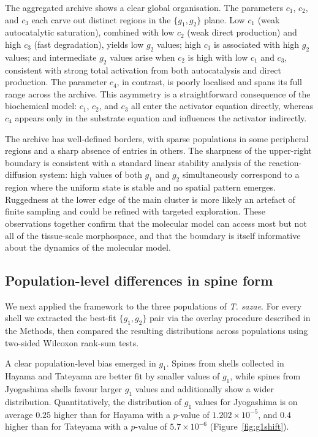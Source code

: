 \documentclass[11pt]{article}
\begin{document}
The aggregated archive shows a clear global organisation. The parameters
$c_1$, $c_2$, and $c_3$ each carve out distinct regions in the $\{g_1,
g_2\}$ plane. Low $c_1$ (weak autocatalytic saturation), combined with low
$c_2$ (weak direct production) and high $c_3$ (fast degradation), yields
low $g_2$ values; high $c_1$ is associated with high $g_2$ values; and
intermediate $g_2$ values arise when $c_2$ is high with low $c_1$ and
$c_3$, consistent with strong total activation from both autocatalysis and
direct production. The parameter $c_4$, in contrast, is poorly localised
and spans its full range across the archive. This asymmetry is a
straightforward consequence of the biochemical model: $c_1$, $c_2$, and
$c_3$ all enter the activator equation directly, whereas $c_4$ appears
only in the substrate equation and influences the activator indirectly.

The archive has well-defined borders, with sparse populations in some
peripheral regions and a sharp absence of entries in others. The sharpness
of the upper-right boundary is consistent with a standard linear stability
analysis of the reaction-diffusion system: high values of both $g_1$ and
$g_2$ simultaneously correspond to a region where the uniform state is
stable and no spatial pattern emerges. Ruggedness at the lower edge of the
main cluster is more likely an artefact of finite sampling and could be
refined with targeted exploration. These observations together confirm
that the molecular model can access most but not all of the tissue-scale
morphospace, and that the boundary is itself informative about the
dynamics of the molecular model.

\subsection{Population-level differences in spine form}

We next applied the framework to the three populations of
\textit{T. sazae}. For every shell we extracted the best-fit
$\{g_1, g_2\}$ pair via the overlay procedure described in the Methods,
then compared the resulting distributions across populations using
two-sided Wilcoxon rank-sum tests.

A clear population-level bias emerged in $g_1$. Spines from shells
collected in Hayama and Tateyama are better fit by smaller values of
$g_1$, while spines from Jyogashima shells favour larger $g_1$ values and
additionally show a wider distribution. Quantitatively, the distribution
of $g_1$ values for Jyogashima is on average $0.25$ higher than for Hayama
with a $p$-value of $1.202 \times 10^{-5}$, and $0.4$ higher than for
Tateyama with a $p$-value of $5.7 \times 10^{-6}$
(Figure~\ref{fig:g1shift}).
\end{document}
